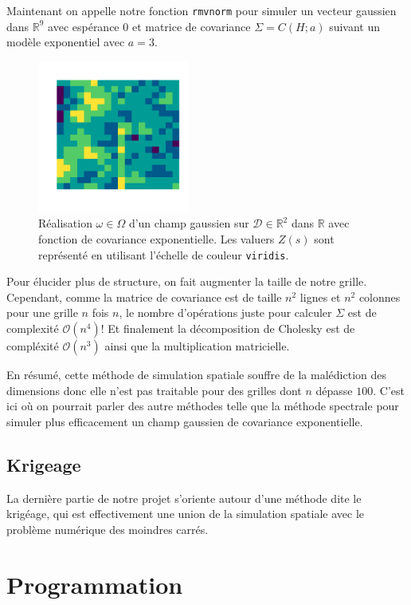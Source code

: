 \documentclass[10pt]{article} %
\begin{document}
Maintenant on appelle notre fonction \texttt{rmvnorm} pour simuler un vecteur gaussien dans $\mathbb{R}^9$ avec espérance $0$ et
matrice de covariance $\Sigma = C(H; a)$ suivant un modèle exponentiel avec $a = 3$.

\begin{figure}[h!]
    \centering
    \includegraphics[width=5cm]{media/grid9.png}
    \caption{Réalisation $\omega \in \Omega$ d'un champ gaussien sur $\mathcal{D} \in \mathbb{R}^2$ dans $\mathbb{R}$ avec fonction de covariance exponentielle. Les valuers $Z(s)$ sont représenté en utilisant l'échelle
    de couleur \texttt{viridis}.}
\end{figure}

Pour élucider plus de structure, on fait augmenter la taille de notre grille. Cependant, comme la matrice de covariance est de taille $n^2$ lignes et $n^2$ colonnes pour une grille $n$ fois $n$, le nombre d'opérations juste pour
calculer $\Sigma$ est de complexité $\mathcal{O}(n^4)$! Et finalement la décomposition de Cholesky est de compléxité $\mathcal{O}(n^3)$ ainsi que la multiplication matricielle.

En résumé, cette méthode de simulation spatiale souffre de la malédiction des dimensions donc elle n'est pas traitable pour des grilles dont $n$
dépasse $100$. C'est ici où on pourrait parler des autre méthodes telle que la méthode spectrale pour simuler plus efficacement un champ gaussien de covariance
exponentielle.

\subsection{Krigeage} La dernière partie de notre projet s'oriente autour d'une méthode dite le krigéage, qui est effectivement une union de la simulation spatiale
avec le problème numérique des moindres carrés.

\section{Programmation}
\end{document}
